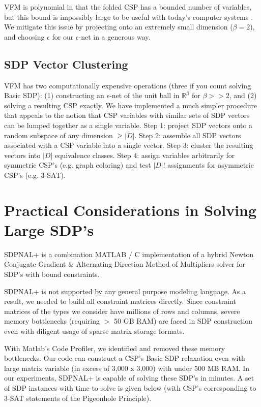 \documentclass[12pt]{article} %
\begin{document}
VFM is polynomial in that the folded CSP has a bounded number of variables, but this bound is impossibly large to be useful with today's computer systems \citep{dwivedi2015introduction}. We mitigate this issue by projecting onto an extremely small dimension ($\beta = 2$), and choosing $\epsilon$ for our $\epsilon$-net in a generous way.

\subsection{SDP Vector Clustering}

VFM has two computationally expensive operations (three if you count solving Basic SDP): (1) constructing an $\epsilon$-net of the unit ball in $\mathbb{R}^\beta$ for $\beta>>2$, and (2) solving a resulting CSP exactly. We have implemented a much simpler procedure that appeals to the notion that CSP variables with similar sets of SDP vectors can be lumped together as a single variable. Step 1: project SDP vectors onto a random subspace of any dimension $\geq |D|$. Step 2: assemble all SDP vectors associated with a CSP variable into a single vector. Step 3: cluster the resulting vectors into $|D|$ equivalence classes. Step 4: assign variables arbitrarily for symmetric CSP's (e.g. graph coloring) and test $|D|!$ assignments for asymmetric CSP's (e.g. 3-SAT).


\section{Practical Considerations in Solving Large SDP's}

SDPNAL+ \cite{yang2015sdpnal+, zhao2010newton} is a combination MATLAB / C implementation of a hybrid Newton Conjugate Gradient \& Alternating Direction Method of Multipliers solver for SDP's with bound constraints.

SDPNAL+ is not supported by any general purpose modeling language. As a result, we needed to build all constraint matrices directly. Since constraint matrices of the types we consider have millions of rows and columns, severe memory bottlenecks (requiring $>$ 50 GB RAM) are faced in SDP construction even with diligent usage of sparse matrix storage formats.

With Matlab's Code Profiler, we identified and removed these memory bottlenecks. Our code can construct a CSP's Basic SDP relaxation even with large matrix variable (in excess of 3,000 x 3,000) with under 500 MB RAM. In our experiments, SDPNAL+ is capable of solving these SDP's in minutes. A set of SDP instances with time-to-solve is given below (with CSP's corresponding to 3-SAT statements of the Pigeonhole Principle).
\end{document}
